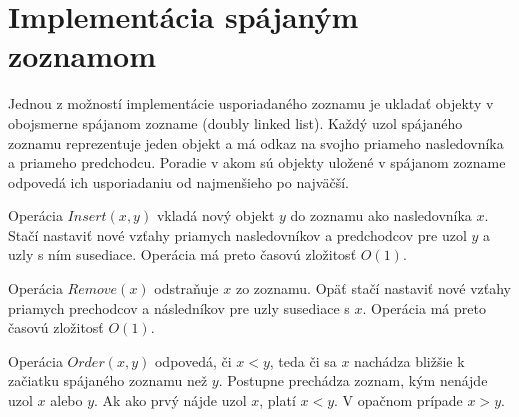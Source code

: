 \documentclass[
  digital,     %
  oneside,     %
  nosansbold,  %
  nocolorbold, %
  lof,         %
  lot,         %
]{fithesis4}
\begin{document}




\chapter{Implementácia spájaným zoznamom}

Jednou z možností implementácie usporiadaného zoznamu je ukladať objekty v obojsmerne spájanom zozname (doubly linked list). Každý uzol spájaného zoznamu reprezentuje jeden objekt a má odkaz na svojho priameho nasledovníka a priameho predchodcu. Poradie v akom sú objekty uložené v spájanom zozname odpovedá ich usporiadaniu od najmenšieho po najväčší.

Operácia $Insert(x, y)$ vkladá nový objekt $y$ do zoznamu ako nasledovníka $x$. Stačí nastaviť nové vzťahy priamych nasledovníkov a predchodcov pre uzol $y$ a uzly s ním susediace. Operácia má preto časovú zložitosť $O(1)$.

Operácia $Remove(x)$ odstraňuje $x$ zo zoznamu. Opäť stačí nastaviť nové vzťahy priamych prechodcov a následníkov pre uzly susediace s $x$. Operácia má preto časovú zložitosť $O(1)$.

Operácia $Order(x, y)$ odpovedá, či $x < y$, teda či sa $x$ nachádza bližšie k začiatku spájaného zoznamu než $y$. Postupne prechádza zoznam, kým nenájde uzol $x$ alebo $y$. Ak ako prvý nájde uzol $x$, platí $x < y$. V opačnom prípade $x > y$.

\end{document}
